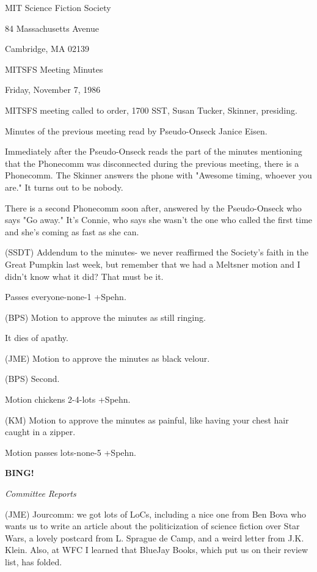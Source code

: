 \documentclass[12pt]{article}
\newcommand{\bing}{{\bf BING!} }
\newcommand{\goto}[1]{\bing \vskip 12pt \centerline{{\em{#1}}}}
\begin{document}
\begin{center}

MIT Science Fiction Society 

84 Massachusetts Avenue

Cambridge, MA 02139

\vspace{12pt}

MITSFS Meeting Minutes 

Friday, November 7, 1986

\end{center}
 
\vspace{18pt}

\setlength{\parskip}{6pt}

\noindent
MITSFS meeting called to order, 1700 SST,
Susan Tucker, Skinner, presiding.

Minutes of the previous meeting read by Pseudo-Onseck Janice Eisen.

Immediately after the Pseudo-Onseck reads the part of the minutes mentioning that the Phonecomm was disconnected during the previous meeting, there is a Phonecomm. The Skinner answers the phone with "Awesome timing, whoever you are." It turns out to be nobody.

There is a second Phonecomm soon after, answered by the Pseudo-Onseck who says "Go away." It's Connie, who says she wasn't the one who called the first time and she's coming as fast as she can.

(SSDT) Addendum to the minutes- we never reaffirmed the Society's faith in the Great Pumpkin last week, but remember that we had a Meltsner motion and I didn't know what it did? That must be it.

Passes everyone-none-1 +Spehn.

(BPS) Motion to approve the minutes as still ringing.

It dies of apathy.

(JME) Motion to approve the minutes as black velour.

(BPS) Second.

Motion chickens 2-4-lots +Spehn.

(KM) Motion to approve the minutes as painful, like having your chest hair caught in a zipper.

Motion passes lots-none-5 +Spehn.

\goto{Committee Reports}

(JME) Jourcomm: we got lots of LoCs, including a nice one from Ben Bova who wants us to write an article about the politicization of science fiction over Star Wars, a lovely postcard from L. Sprague de Camp, and a weird letter from J.K. Klein. Also, at WFC I learned that BlueJay Books, which put us on their review list, has folded.
\end{document}
